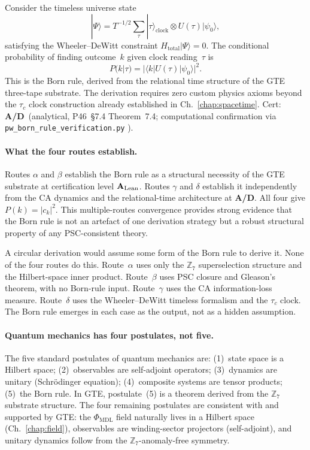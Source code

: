 \documentclass[11pt,openany]{book}
\theoremstyle{remark}
\newcommand{\MDL}{\text{MDL}}
\newcommand{\CatAL}{\ensuremath{\textbf{A}_{\rm Lean}}}
\newcommand{\CatAD}{\textbf{A/D}}
\begin{document}
Consider the timeless universe state
\[
  |\Psi\rangle = T^{-1/2}\sum_\tau |\tau\rangle_{\mathrm{clock}}\otimes U(\tau)|\psi_0\rangle,
\]
satisfying the Wheeler--DeWitt constraint $H_{\mathrm{total}}|\Psi\rangle = 0$.
The conditional probability of finding outcome~$k$ given clock reading~$\tau$ is
\[
  P(k|\tau) = |\langle k|U(\tau)|\psi_0\rangle|^2.
\]
This is the Born rule, derived from the relational time structure of the GTE three-tape
substrate.  The derivation requires zero custom physics axioms beyond the
$\tau_c$ clock construction already established in Ch.~\ref{chap:spacetime}.
Cert: \CatAD\ (analytical, P46~§7.4 Theorem~7.4; computational confirmation
via \texttt{pw\_born\_rule\_verification.py} \cite{SpivackGTEPolynomialUFT}).

\paragraph{What the four routes establish.}

Routes $\alpha$ and $\beta$ establish the Born rule as a structural necessity of the GTE
substrate at certification level \CatAL.  Routes $\gamma$ and $\delta$ establish it
independently from the CA dynamics and the relational-time architecture at \CatAD.
All four give $P(k) = |c_k|^2$.  This multiple-routes convergence provides strong
evidence that the Born rule is not an artefact of one derivation strategy but a robust
structural property of any PSC-consistent theory.

\begin{tcolorbox}[colback=yellow!8,colframe=yellow!60!black,
  title={Why This Is Not a Circular Argument}]
  A circular derivation would assume some form of the Born rule to derive it.
  None of the four routes do this.  Route~$\alpha$ uses only the $\mathbb{Z}_7$
  superselection structure and the Hilbert-space inner product.  Route~$\beta$ uses
  PSC closure and Gleason's theorem, with no Born-rule input.  Route~$\gamma$ uses
  the CA information-loss measure.  Route~$\delta$ uses the Wheeler--DeWitt
  timeless formalism and the $\tau_c$ clock.  The Born rule emerges in each case
  as the output, not as a hidden assumption.
\end{tcolorbox}

\paragraph{Quantum mechanics has four postulates, not five.}

The five standard postulates of quantum mechanics are: (1)~state space is a
Hilbert space; (2)~observables are self-adjoint operators; (3)~dynamics are unitary
(Schr\"{o}dinger equation); (4)~composite systems are tensor products;
(5)~the Born rule.  In GTE, postulate~(5) is a theorem derived from the $\mathbb{Z}_7$
substrate structure.  The four remaining postulates are consistent with and supported
by GTE: the $\Phi_{\MDL}$ field naturally lives in a Hilbert space (Ch.~\ref{chap:field}),
observables are winding-sector projectors (self-adjoint), and
unitary dynamics follow from the $\mathbb{Z}_7$-anomaly-free symmetry.
\end{document}
